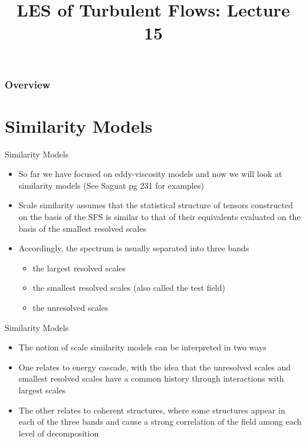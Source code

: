  
\title{LES of Turbulent Flows: Lecture 15}



\begin{frame} 
  \titlepage
\end{frame}


\begin{frame}
\frametitle{Overview}
\tableofcontents
\end{frame}

\section{Similarity Models} %
\begin{frame}{Similarity Models}
\begin{itemize}
	\item So far we have focused on eddy-viscosity models and now we will look at similarity models (See Saguat pg 231 for examples)
	\item Scale similarity assumes that the statistical structure of tensors constructed on the basis of the SFS is similar to that of their equivalents evaluated on the basis of the smallest resolved scales
	\item Accordingly, the spectrum is usually separated into three bands
	\begin{itemize}
		\item the largest resolved scales
		\item the smallest resolved scales (also called the test field)
		\item the unresolved scales
	\end{itemize}
\end{itemize}

\end{frame}

\begin{frame}{Similarity Models}
\begin{itemize}
	\item The notion of scale similarity models can be interpreted in two ways
	\item One relates to energy cascade, with the idea that the unresolved scales and smallest resolved scales have a common history through interactions with largest scales
	\item The other relates to coherent structures, where some structures appear in each of the three bands and cause a strong correlation of the field among each level of decomposition
\end{itemize}

\end{frame}

